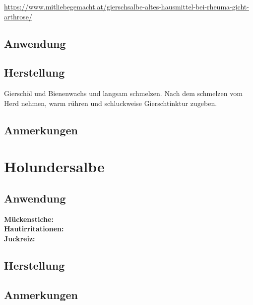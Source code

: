 
\url{https://www.mitliebegemacht.at/gierschsalbe-altes-hausmittel-bei-rheuma-gicht-arthrose/}

    

\subsection{Anwendung}
\subsection{Herstellung}
Gierschöl und Bienenwachs und langsam schmelzen. Nach dem schmelzen vom Herd nehmen, warm rühren und schluckweise Gierschtinktur zugeben.

\subsection{Anmerkungen}


\newpage


\section{Holundersalbe}


   

\subsection{Anwendung}
\textbf{Mückenstiche:} \\ 

\textbf{Hautirritationen:} \\ 

\textbf{Juckreiz:} \\ 

\subsection{Herstellung}
\subsection{Anmerkungen}





\newpage




